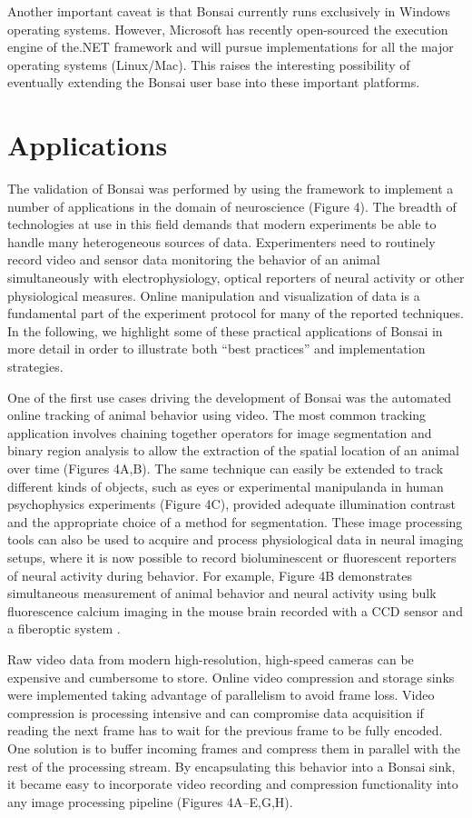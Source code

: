 Another important caveat is that Bonsai currently runs exclusively in Windows operating systems. However, Microsoft has recently open-sourced the execution engine of the.NET framework and will pursue implementations for all the major operating systems (Linux/Mac). This raises the interesting possibility of eventually extending the Bonsai user base into these important platforms.

\section{Applications}

The validation of Bonsai was performed by using the framework to implement a number of applications in the domain of neuroscience (Figure 4). The breadth of technologies at use in this field demands that modern experiments be able to handle many heterogeneous sources of data. Experimenters need to routinely record video and sensor data monitoring the behavior of an animal simultaneously with electrophysiology, optical reporters of neural activity or other physiological measures. Online manipulation and visualization of data is a fundamental part of the experiment protocol for many of the reported techniques. In the following, we highlight some of these practical applications of Bonsai in more detail in order to illustrate both “best practices” and implementation strategies.

One of the first use cases driving the development of Bonsai was the automated online tracking of animal behavior using video. The most common tracking application involves chaining together operators for image segmentation and binary region analysis to allow the extraction of the spatial location of an animal over time (Figures 4A,B). The same technique can easily be extended to track different kinds of objects, such as eyes or experimental manipulanda in human psychophysics experiments (Figure 4C), provided adequate illumination contrast and the appropriate choice of a method for segmentation. These image processing tools can also be used to acquire and process physiological data in neural imaging setups, where it is now possible to record bioluminescent or fluorescent reporters of neural activity during behavior. For example, Figure 4B demonstrates simultaneous measurement of animal behavior and neural activity using bulk fluorescence calcium imaging in the mouse brain recorded with a CCD sensor and a fiberoptic system \cite{Tecuapetla2014}.

Raw video data from modern high-resolution, high-speed cameras can be expensive and cumbersome to store. Online video compression and storage sinks were implemented taking advantage of parallelism to avoid frame loss. Video compression is processing intensive and can compromise data acquisition if reading the next frame has to wait for the previous frame to be fully encoded. One solution is to buffer incoming frames and compress them in parallel with the rest of the processing stream. By encapsulating this behavior into a Bonsai sink, it became easy to incorporate video recording and compression functionality into any image processing pipeline (Figures 4A–E,G,H).

